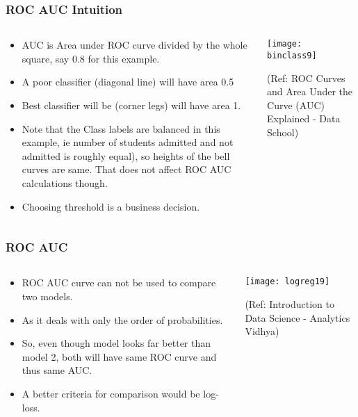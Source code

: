\begin{frame}[fragile]\frametitle{ROC AUC Intuition}

\begin{columns}
\begin{column}[T]{0.5\linewidth}
\begin{itemize}
\item AUC is Area under ROC curve divided by the whole square, say 0.8 for this example.
\item A poor classifier (diagonal line) will have area 0.5
\item Best classifier will be (corner legs) will have area 1.
\item Note that the Class labels are balanced in this example, ie number of students admitted and not admitted is roughly equal), so heights of the bell curves are same. That does not affect ROC AUC calculations though.
\item Choosing threshold is a business decision.
\end{itemize}
\end{column}
\begin{column}[T]{0.5\linewidth}

\begin{center}
\texttt{[image: binclass9]}
\end{center}

\tiny{(Ref: ROC Curves and Area Under the Curve (AUC) Explained - Data School)}
\end{column}

\end{columns}
\end{frame}

\begin{frame}[fragile]\frametitle{ROC AUC}

\begin{columns}
\begin{column}[T]{0.5\linewidth}
\begin{itemize}
\item ROC AUC curve can not be used to compare two models.
\item As it deals with only the order of probabilities.
\item So, even though model looks far better than model 2, both will have same ROC curve and thus same AUC.
\item A better criteria for comparison would be log-loss.
\end{itemize}
\end{column}
\begin{column}[T]{0.5\linewidth}

\begin{center}
\texttt{[image: logreg19]}
\end{center}

{\tiny (Ref: Introduction to Data Science - Analytics Vidhya)}
\end{column}

\end{columns}
\end{frame}

